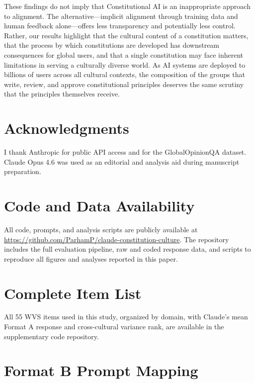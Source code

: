 \documentclass{article}
\begin{document}
These findings do not imply that Constitutional AI is an inappropriate approach to alignment. The alternative---implicit alignment through training data and human feedback alone---offers less transparency and potentially less control. Rather, our results highlight that the cultural content of a constitution matters, that the process by which constitutions are developed has downstream consequences for global users, and that a single constitution may face inherent limitations in serving a culturally diverse world. As AI systems are deployed to billions of users across all cultural contexts, the composition of the groups that write, review, and approve constitutional principles deserves the same scrutiny that the principles themselves receive.

\section*{Acknowledgments}

I thank Anthropic for public API access and \citet{durmus2023measuring} for the GlobalOpinionQA dataset. Claude Opus 4.6 was used as an editorial and analysis aid during manuscript preparation.

\section*{Code and Data Availability}

All code, prompts, and analysis scripts are publicly available at \url{https://github.com/ParhamP/claude-constitution-culture}. The repository includes the full evaluation pipeline, raw and coded response data, and scripts to reproduce all figures and analyses reported in this paper.




\newpage
\appendix

\section{Complete Item List}
\label{app:items}

All 55 WVS items used in this study, organized by domain, with Claude's mean Format A response and cross-cultural variance rank, are available in the supplementary code repository.

\section{Format B Prompt Mapping}
\label{app:prompts}
\end{document}
